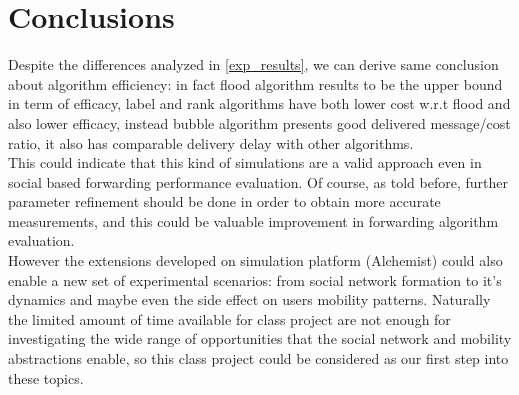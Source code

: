 \section{Conclusions}
\label{conclusions}

Despite the differences analyzed in \ref{exp_results}, we can derive same conclusion about algorithm efficiency: in fact flood algorithm results to be the upper bound in term of efficacy, label and rank algorithms have both lower cost w.r.t flood and also lower efficacy, instead bubble algorithm presents good delivered message/cost ratio, it also has comparable delivery delay with other algorithms.\\
This could indicate that this kind of simulations are a valid approach even in social based forwarding performance evaluation. Of course, as told before, further parameter refinement should be done in order to obtain more accurate measurements, and this could be valuable improvement in forwarding algorithm evaluation.\\
However the extensions developed on simulation platform (Alchemist) could also enable a new set of experimental scenarios: from social network formation to it's dynamics and maybe even the side effect on users mobility patterns. Naturally the limited amount of time available for class project are not enough for investigating the wide range of opportunities that the social network and mobility abstractions enable, so this class project could be considered as our first step into these topics.  
